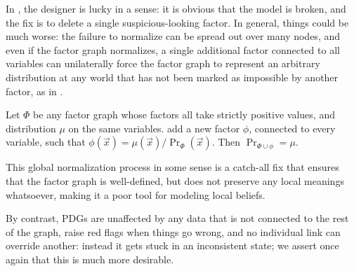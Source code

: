 \documentclass{article}
\newcommand{\MN}{PDG}
\newcommand{\MNs}{\MN s}
\numberwithin{equation}{section}
\begin{document}
	In , the designer is lucky in a sense: it is obvious that the model is broken, and the fix is to delete a single suspicious-looking factor.
	In general, things could be much worse: the failure to normalize can be spread out over many nodes, and even if the factor graph normalizes, a single additional factor connected to all variables can unilaterally force the factor graph to represent an arbitrary distribution at any world that has not been marked as impossible by another factor, as in .
	
	\begin{example}\label{ex:fg-volatile-2}
		Let $\Phi$ be any factor graph whose factors all take strictly positive values, and distribution $\mu$ on the same variables. add a new factor $\phi$, connected to every variable, such that $\phi(\vec x) = {\mu(\vec x)}/{\Pr_\Phi(\vec x)}$. Then $\Pr_{\Phi \cup \phi} = \mu$. 
	\end{example}

 	This global normalization process in some sense is a catch-all fix that ensures that the factor graph is well-defined, but does not preserve any local meanings whatsoever, making it a poor tool for modeling local beliefs.
	
	
	By contrast, PDGs are unaffected by any data that is not connected  to the rest of the graph, raise red flags when things go wrong, and no individual link can override another: instead it gets stuck in an inconsistent state; we assert once again that this is much more desirable.
	
	
	
\end{document}
